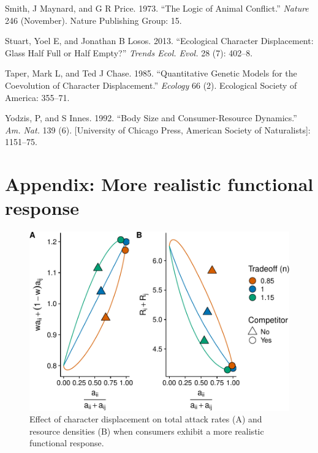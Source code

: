 \documentclass[11pt,]{article}
\begin{document}
\hypertarget{ref-Smith1973}{}
Smith, J Maynard, and G R Price. 1973. ``The Logic of Animal Conflict.''
\emph{Nature} 246 (November). Nature Publishing Group: 15.

\hypertarget{ref-Stuart2013}{}
Stuart, Yoel E, and Jonathan B Losos. 2013. ``Ecological Character
Displacement: Glass Half Full or Half Empty?'' \emph{Trends Ecol. Evol.}
28 (7): 402--8.

\hypertarget{ref-Taper1985}{}
Taper, Mark L, and Ted J Chase. 1985. ``Quantitative Genetic Models for
the Coevolution of Character Displacement.'' \emph{Ecology} 66 (2).
Ecological Society of America: 355--71.

\hypertarget{ref-Yodzis1992}{}
Yodzis, P, and S Innes. 1992. ``Body Size and Consumer-Resource
Dynamics.'' \emph{Am. Nat.} 139 (6). {[}University of Chicago Press,
American Society of Naturalists{]}: 1151--75.

\newpage

\section{Appendix: More realistic functional
response}\label{appendix-more-realistic-functional-response}

\begin{figure}
\centering
\includegraphics{manuscript_ECD_model_files/figure-latex/McCann_Resources-1.pdf}
\caption{\label{fig:McCann_Resources}Effect of character displacement on
total attack rates (A) and resource densities (B) when consumers exhibit
a more realistic functional response.}
\end{figure}
\end{document}
